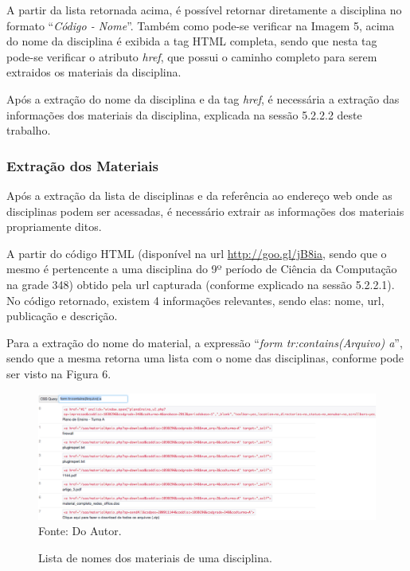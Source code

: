 A partir da lista retornada acima, é possível retornar diretamente a disciplina no formato ``\emph{Código - Nome}''. Também como pode-se verificar na Imagem 5, acima do nome da disciplina é exibida a tag HTML completa, sendo que nesta tag pode-se verificar o atributo \emph{href}, que possui o caminho completo para serem extraidos os materiais da disciplina.

Após a extração do nome da disciplina e da tag \emph{href}, é necessária a extração das informações dos materiais da disciplina, explicada na sessão 5.2.2.2 deste trabalho.

\subsubsection{Extração dos Materiais}
Após a extração da lista de disciplinas e da referência ao endereço web onde as disciplinas podem ser acessadas, é necessário extrair as informações dos materiais propriamente ditos.

A partir do código HTML (disponível na url \url{http://goo.gl/jB8ia}, sendo que o mesmo é pertencente a uma disciplina do 9º período de Ciência da Computação na grade 348) obtido pela url capturada (conforme explicado na sessão 5.2.2.1). No código retornado, existem 4 informações relevantes, sendo elas: nome, url, publicação e descrição.

Para a extração do nome do material, a expressão ``\emph{form tr:contains(Arquivo) a}'', sendo que a mesma retorna uma lista com o nome das disciplinas, conforme pode ser visto na Figura 6.

\begin{figure}[!htb]
     \centering
     \caption[Extração de Informações - Lista de Nomes dos Materiais de uma disciplina]{Lista de nomes dos materiais de uma disciplina.}
     \includegraphics[scale=0.35]{imagens/listamateriaisdisciplinasnomematerial.png}
     \\  Fonte: Do Autor.
\end{figure}

